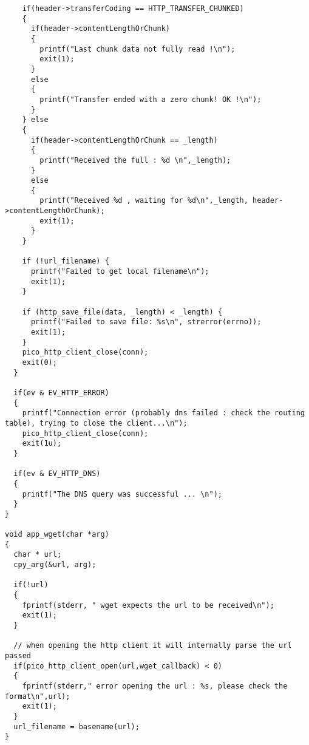 \begin{verbatim}
    if(header->transferCoding == HTTP_TRANSFER_CHUNKED)
    {
      if(header->contentLengthOrChunk)
      {
        printf("Last chunk data not fully read !\n");
        exit(1);
      }
      else
      {
        printf("Transfer ended with a zero chunk! OK !\n");
      }
    } else
    {
      if(header->contentLengthOrChunk == _length)
      {
        printf("Received the full : %d \n",_length);
      }
      else
      {
        printf("Received %d , waiting for %d\n",_length, header->contentLengthOrChunk);
        exit(1);
      }
    }

    if (!url_filename) {
      printf("Failed to get local filename\n");
      exit(1);
    }

    if (http_save_file(data, _length) < _length) {
      printf("Failed to save file: %s\n", strerror(errno));
      exit(1);
    }
    pico_http_client_close(conn);
    exit(0);
  }

  if(ev & EV_HTTP_ERROR)
  {
    printf("Connection error (probably dns failed : check the routing table), trying to close the client...\n");
    pico_http_client_close(conn);
    exit(1u);
  }

  if(ev & EV_HTTP_DNS)
  {
    printf("The DNS query was successful ... \n");
  }
}

void app_wget(char *arg)
{
  char * url;
  cpy_arg(&url, arg);

  if(!url)
  {
    fprintf(stderr, " wget expects the url to be received\n");
    exit(1);
  }
  
  // when opening the http client it will internally parse the url passed
  if(pico_http_client_open(url,wget_callback) < 0)
  {
    fprintf(stderr," error opening the url : %s, please check the format\n",url);
    exit(1);
  }
  url_filename = basename(url);
}
\end{verbatim}

